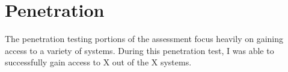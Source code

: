 
\section{\label{sec:penetration}Penetration}
The penetration testing portions of the assessment focus heavily on gaining
access to a variety of systems. During this penetration test, I was able to
successfully gain access to X out of the X systems.

\newcommand{\hostname}{}
\newcommand{\ip}{}
\newcommand{\tcpports}{}
\newcommand{\udpports}{}
\newcommand{\os}{}
\newcommand{\vuln}{}
\newcommand{\product}{}
\newcommand{\vulnx}{}
\newcommand{\productx}{}



